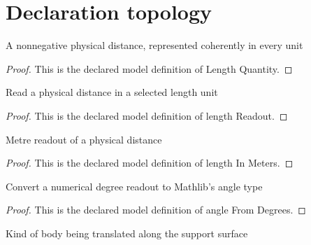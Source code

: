 \section{Declaration topology}
\begin{definition}
  \label{def:physics:phyx-mini-0733:phyxminiproblems-problemphyxmini0733-lengthquantity}
  A nonnegative physical distance, represented coherently in every unit
\end{definition}
\begin{proof}
  This is the declared model definition of Length Quantity.
\end{proof}
\begin{definition}
  \label{def:physics:phyx-mini-0733:phyxminiproblems-problemphyxmini0733-lengthreadout}
  Read a physical distance in a selected length unit
\end{definition}
\begin{proof}
  This is the declared model definition of length Readout.
\end{proof}
\begin{definition}
  \label{def:physics:phyx-mini-0733:phyxminiproblems-problemphyxmini0733-lengthinmeters}
  Metre readout of a physical distance
\end{definition}
\begin{proof}
  This is the declared model definition of length In Meters.
\end{proof}
\begin{definition}
  \label{def:physics:phyx-mini-0733:phyxminiproblems-problemphyxmini0733-anglefromdegrees}
  Convert a numerical degree readout to Mathlib's angle type
\end{definition}
\begin{proof}
  This is the declared model definition of angle From Degrees.
\end{proof}
\begin{definition}
  \label{def:physics:phyx-mini-0733:phyxminiproblems-problemphyxmini0733-movingbodykind}
  Kind of body being translated along the support surface
\end{definition}
